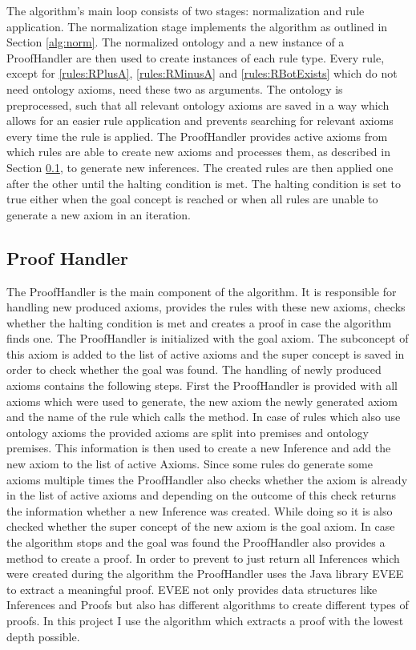 \documentclass[titlepage]{article}
\begin{document}
The algorithm's main loop consists of two stages: normalization and rule application.
The normalization stage implements the algorithm as outlined in Section \ref{alg:norm}. The normalized
ontology and a new instance of a ProofHandler are then used to create instances of each rule type. 
Every rule, except for \ref{rules:RPlusA}, \ref{rules:RMinusA} and \ref{rules:RBotExists}   which do not need ontology axioms, need these two as 
arguments. The ontology is preprocessed, such that all relevant ontology axioms are saved in a way which 
allows for an easier rule application and prevents searching for relevant axioms every time the rule is 
applied. The ProofHandler provides active axioms from which rules are able to create new axioms and processes
them, as described in Section \ref{alg:proofHandler}, to generate new inferences. The created rules are then applied 
one after the other until the halting condition is met.  The halting condition is set to true either when 
the goal concept is reached or when all rules are unable to generate a new axiom in an iteration. 


\subsection{Proof Handler}\label{alg:proofHandler}
The ProofHandler is the main component of the algorithm. It is responsible for handling new produced axioms,
provides the rules with these new axioms, checks whether the halting condition is met and creates a proof
in case the algorithm finds one. The ProofHandler is initialized with the goal axiom. The subconcept of this
axiom is added to the list of active axioms and the super concept is saved in order to check whether the goal
was found. The handling of newly produced axioms contains the following steps. First the ProofHandler is provided
with all axioms which were used to generate, the new axiom the newly generated axiom and the name of the rule which 
calls the method. In case of rules which also use ontology axioms
the provided axioms are split into premises and ontology premises. This information is then used to create a new
Inference and add the new axiom to the list of active Axioms. Since some rules do generate some axioms multiple
times the ProofHandler also checks whether the axiom is already in the list of active axioms and depending on
the outcome of this check returns the information whether a new Inference was created. While doing so it is also
checked whether the super concept of the new axiom is the goal axiom. In case the algorithm stops
and the goal was found the ProofHandler also provides a method to create a proof. In order to prevent to just
return all Inferences which were created during the algorithm the ProofHandler uses the Java library EVEE to extract
a meaningful proof.
EVEE not only provides data structures like Inferences and Proofs but also has different algorithms to create
different types of proofs. In this project I use the algorithm which extracts a proof with the lowest depth possible.
\end{document}
